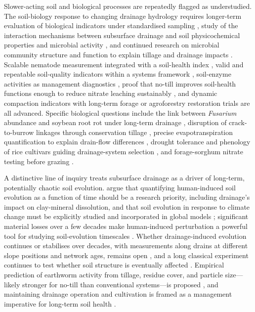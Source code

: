 Slower-acting soil and biological processes are repeatedly flagged as understudied. The soil-biology response to changing drainage hydrology requires longer-term evaluation of biological indicators under standardised sampling \parencite{Sherbine2023}, study of the interaction mechanisms between subsurface drainage and soil physicochemical properties and microbial activity \parencite{Yang2025}, and continued research on microbial community structure and function to explain tillage and drainage impacts \parencite{Kaur2024b,Kumar2014}. Scalable nematode measurement integrated with a soil-health index \parencite{Li2023b}, valid and repeatable soil-quality indicators within a systems framework \parencite{Nakajima2015}, soil-enzyme activities as management diagnostics \parencite{Singh2007}, proof that no-till improves soil-health functions enough to reduce nitrate leaching sustainably \parencite{Masri2024}, and dynamic compaction indicators with long-term forage or agroforestry restoration trials \parencite{Caron2025} are all advanced. Specific biological questions include the link between \textit{Fusarium} abundance and soybean root rot under long-term drainage \parencite{Han2017}, disruption of crack-to-burrow linkages through conservation tillage \parencite{Shipitalo2004}, precise evapotranspiration quantification to explain drain-flow differences \parencite{Daigh2014}, drought tolerance and phenology of rice cultivars guiding drainage-system selection \parencite{DarziNaftchali2017b}, and forage-sorghum nitrate testing before grazing \parencite{Nash2017}.

A distinctive line of inquiry treats subsurface drainage as a driver of long-term, potentially chaotic soil evolution. \textcite{Montagne2009} argue that quantifying human-induced soil evolution as a function of time should be a research priority, including drainage's impact on clay-mineral dissolution, and that soil evolution in response to climate change must be explicitly studied and incorporated in global models \parencite{Montagne2010}; significant material losses over a few decades make human-induced perturbation a powerful tool for studying soil-evolution timescales \parencite{Montagne2013}. Whether drainage-induced evolution continues or stabilises over decades, with measurements along drains at different slope positions and network ages, remains open \parencite{Frison2009}, and a long classical experiment continues to test whether soil structure is eventually affected \parencite{HOOGHOUDT1952}. Empirical prediction of earthworm activity from tillage, residue cover, and particle size---likely stronger for no-till than conventional systems---is proposed \parencite{Ouellet2008}, and maintaining drainage operation and cultivation is framed as a management imperative for long-term soil health \parencite{Singh2007}.

